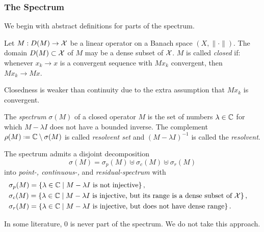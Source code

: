 \subsubsection{The Spectrum}

We begin with abstract definitions for parts of the spectrum. 

\begin{definition}
    Let $M : D(M) \to \mathcal{X}$ be a linear operator on a Banach space 
    $(X, \| \cdot \|)$. The domain $D(M) \subset \mathcal{X}$ of $M$ 
    may be a dense subset of $\mathcal{X}$. $M$ is called \emph{closed} if: whenever 
    $x_k \to x$ is a convergent sequence with $M x_k$ convergent, then $M x_k \to M x$. 
\end{definition}

Closedness is weaker than continuity due to the extra assumption that $M x_k$ is 
convergent. 

\begin{definition}
    The \emph{spectrum} $\sigma (M)$ of a closed operator $M$ is the set of numbers 
    $\lambda \in \mathbb{C}$ for which $M - \lambda I$ does not have a bounded inverse. The 
    complement $\rho (M) \defeq \bbC \setminus \sigma (M)$ is called \emph{resolvent set} 
    and $( M - \lambda I )^{-1}$ is called the \emph{resolvent}. 
\end{definition}

\begin{proposition}
    The spectrum admits a disjoint decomposition 
    \begin{equation}
        \sigma (M) = \sigma_p (M) \uplus \sigma_c (M) \uplus \sigma_r (M)
    \end{equation}
    into \emph{point-, continuous-,} and \emph{residual-spectrum} with
    \begin{align}
        &\sigma_p (M) = \left\{ \lambda \in \mathbb{C} \mid 
            M - \lambda I \text{ is not injective} \right\}, &\phantom{.} \\
        &\sigma_c (M) = \left\{ \lambda \in \mathbb{C} \mid 
            M - \lambda I \text{ is injective, but its range is a dense subset of } 
            \mathcal{X} \right\}, \\
        &\sigma_r (M) = \left\{ \lambda \in \mathbb{C} \mid 
            M - \lambda I \text{ is injective, but does not have dense range} \right\}. 
    \end{align}
\end{proposition}

\begin{remark}
    In some literature, $0$ is never part of the spectrum. We do not take this approach. 
\end{remark}

